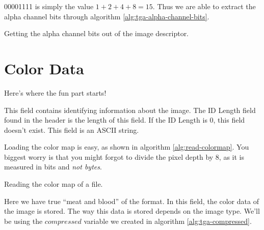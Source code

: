 \begin{refsection}
  00001111 is simply the value $1 + 2 + 4 + 8 = 15$. Thus we are able
  to extract the alpha channel bits through algorithm
  \ref{alg:tga-alpha-channel-bits}.

  \begin{algorithm}[H]
    \caption{Getting the alpha channel bits out of the image descriptor.}
    \label{alg:tga-alpha-channel-bits}
    \begin{algorithmic}[1]
    \end{algorithmic}
  \end{algorithm}



  \section{Color Data}
  \label{sec:color-data}

  Here's where the fun part starts!


  This field contains identifying information about the image. The
  ID Length field found in the header is the length of this field. If
  the ID Length is 0, this field doesn't exist. This field is an ASCII
  string.


  Loading the color map is easy, as shown in algorithm
  \ref{alg:read-colormap}. You
  biggest worry is that you might forgot to divide the pixel depth by
  8, as it is measured in bits and \textit{not bytes}.

  \begin{algorithm}[H]
    \caption{Reading the color map of a \tga file.}
    \label{alg:read-colormap}
    \begin{algorithmic}[1]
      \State {}
      \EndFor
    \end{algorithmic}
  \end{algorithm}


  Here we have true ``meat and blood'' of the \tga format. In this
  field, the color data of the image is stored. The way this data is
  stored depends on the image type. We'll be using the $compressed$
  variable we created in algorithm \ref{alg:tga-compressed}.


\end{refsection}
